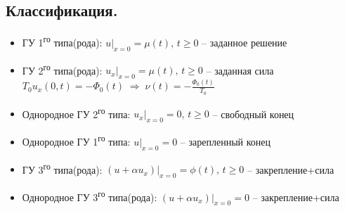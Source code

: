 \subsection{Классификация.}
\begin{itemize}
	\item ГУ 1\textsuperscript{го} типа(рода): $ u|_{x=0}=\mu(t),\,t\ge0 $ -- заданное решение
	\item ГУ 2\textsuperscript{го} типа(рода): $ u_x|_{x=0}=\mu(t),\,t\ge0 $ -- заданная сила \\
	      \hspace*{2em}$\displaystyle T_0 u_x(0,t)=-\Phi_0(t) \;\Longrightarrow\; \nu(t)=-\frac{\Phi_0(t)}{T_0} $ %
	\item Однородное ГУ 2\textsuperscript{го} типа: $ u_x|_{x=0}=0,\,t\ge0 $ -- свободный конец
	\item Однородное ГУ 1\textsuperscript{го} типа: $ u|_{x=0}=0$ -- зарепленный конец%
	\item ГУ 3\textsuperscript{го} типа(рода): $ (u+\alpha u_x)|_{x=0}=\phi(t),\,t\ge0 $ -- закрепление+сила%
	\item Однородное ГУ 3\textsuperscript{го} типа(рода): $ (u+\alpha u_x)|_{x=0}=0$ -- закрепление+сила%
\end{itemize}
